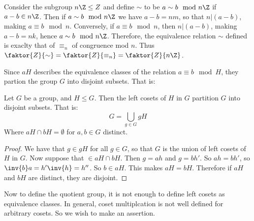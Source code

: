 \begin{example}\label{3.3}
    Consider the subgroup $n\Z \leq Z$ and define  $\sim$ to be $a \sim b
    \mod{n\Z}$ if $a-b \in n\Z$. Then if  $a \sim b \mod{n\Z}$ we have
    $a-b=nm$, so that  $n|(a-b)$, making $a \equiv b \mod{n}$. Conversely, if $a
    \equiv b \mod{n}$, then $n|(a-b)$, making $a-b=nk$, hence  $a \sim b
    \mod{n\Z}$. Therefore, the equivalence relation $\sim$ defined is exaclty
    that of $\equiv_n$ of congruence mod $n$. Thus
    $\faktor{Z}{\sim}=\faktor{Z}{\equiv_n}=\faktor{Z}{n\Z}$.
\end{example}

Since $aH$ describes the equivalence classes of the relation  $a \equiv b
\mod{H}$, they partion the group $G$ into disjoint subsets. That is:

 \begin{theorem}\label{3.2.2}
     Let $G$ be a group, and  $H \leq G$. Then the left cosets of $H$ in $G$
     partition $G$ into disjoint subsets. That is:
     \begin{equation}
         G = \bigcup_{g \in G}{gH}
     \end{equation}
     Where $aH \cap bH=\emptyset$ for  $a,b \in G$ distinct.
\end{theorem}
\begin{proof}
    We have that $g \in gH$ for all $g \in G$, so that  $G$ is the union of left
    cosets of  $H$ in  $G$. Now suppose that $ \in aH \cap bH$. Then  $g=ah$ and
     $g=bh'$. So $ah=bh'$, so  $\inv{b}a = h'\inv{h}=h''$. So $b \in aH$. This
     makes $aH=bH$. Therefore if $aH$ and $bH$ are distinct, they are disjoint.
\end{proof}

Now to define the quotient group, it is not enough to define left cosets as
equivalence classes. In general, coset multiplcation is not well defined for
arbitrary cosets. So we wish to make an assertion.

